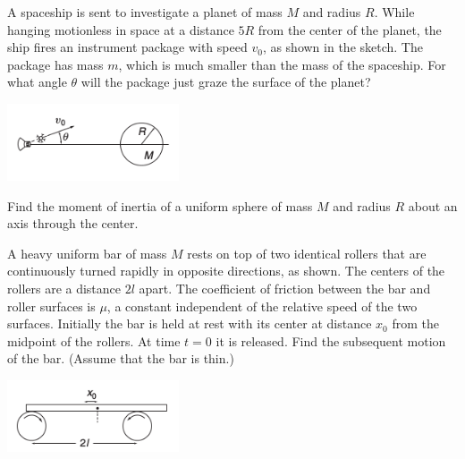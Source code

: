 \documentclass[12pt,letterpaper]{hmcpset}
\begin{document}

\begin{problem}
    A spaceship is sent to investigate a planet of
    mass $M$ and radius $R$. While hanging motionless
    in space at a distance $5R$ from the center of
    the planet, the ship fires an instrument package
    with speed $v_{0}$, as shown in the sketch. The
    package has mass $m$, which is much smaller than
    the mass of the spaceship. For what angle $\theta$
    will the package just graze the surface of the planet?

    \begin{center}
    \includegraphics[width=2in]{img/7_4}
    \end{center}
\end{problem}

\begin{solution}
    \vfill
\end{solution}
\clearpage

\begin{problem}
    Find the moment of inertia of a uniform
    sphere of mass $M$ and radius $R$ about
    an axis through the center.
\end{problem}

\begin{solution}
    \vfill
\end{solution}
\clearpage

\begin{problem}
    A heavy uniform bar of mass $M$ rests on top
    of two identical rollers that are continuously
    turned rapidly in opposite directions, as shown.
    The centers of the rollers are a distance $2l$
    apart. The coefficient of friction between the
    bar and roller surfaces is $\mu$, a constant
    independent of the relative speed of the two
    surfaces. Initially the bar is held at rest with
    its center at distance $x_{0}$ from the midpoint
    of the rollers. At time $t = 0$ it is released.
    Find the subsequent motion of the bar.
    (Assume that the bar is thin.)
    \begin{center}
        \includegraphics[width=2in]{img/7_9}
    \end{center}
\end{problem}
\end{document}
